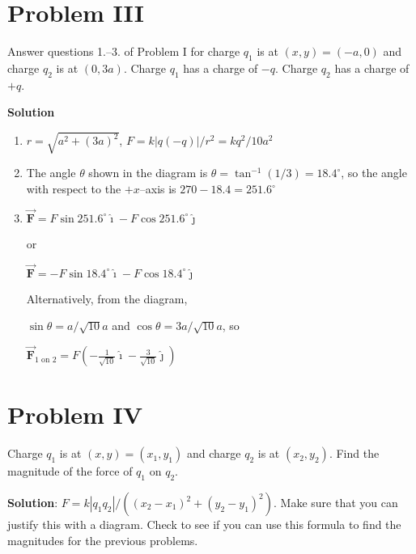 \documentclass{article}
\renewcommand{\mbox}{\text}
\newcommand{\ds}[0]{\displaystyle}
\newcommand{\ihat}[0]{\hat{\boldsymbol{\imath}}}
\newcommand{\jhat}[0]{\hat{\boldsymbol{\jmath}}}
\newcommand{\bfvec}[1]{\vec{\mathbf{#1}}}
\begin{document}

\fi

\section{Problem III}

Answer questions 1.--3. of Problem I for charge $q_1$ is at $(x,y)=(-a,0)$ and charge $q_2$ is at $(0, 3a)$. Charge $q_1$ has a charge of $-q$. Charge $q_2$ has a charge of $+q$.

\ifsolutions
{\bf Solution}


    \begin{enumerate}

      \item $r=\sqrt{a^2+(3a)^2}$, $F=k|q(-q)|/r^2=kq^2/10a^2$

      \item The angle $\theta$ shown in the diagram is $\theta=\tan^{-1}(1/3)=18.4^\circ$, so the angle with respect to the $+x$--axis is $270-18.4=251.6^\circ$

      \item $\bfvec{F}=F\sin251.6^\circ\ihat - F\cos251.6^\circ\jhat$

            or

            $\bfvec{F}=-F\sin 18.4^\circ\ihat - F\cos18.4^\circ\jhat$

            Alternatively, from the diagram,

            $\sin\theta = a/\sqrt{10}a$ and $\cos\theta = 3a/\sqrt{10}a$, so

            $\ds\bfvec{F}_{1\mbox{ on } 2} = F\left(-\frac{1}{\sqrt{10}}\ihat - \frac{3}{\sqrt{10}}\jhat\right)$

    \end{enumerate}
\else


\fi

\section{Problem IV}

Charge $q_1$ is at $(x,y)=(x_1,y_1)$ and charge $q_2$ is at $(x_2, y_2)$. Find the magnitude of the force of $q_1$ on $q_2$.

\ifsolutions
{\bf Solution}: $F=k|q_1q_2|/\left((x_2-x_1)^2 + (y_2-y_1)^2\right)$. Make sure that you can justify this with a diagram. Check to see if you can use this formula to find the magnitudes for the previous problems.
\fi
\end{document}
